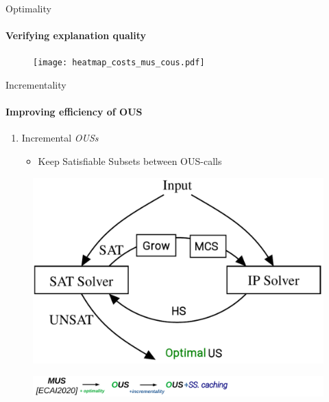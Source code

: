\documentclass[handout]{beamer}
\begin{document}
\begin{frame}{Optimality}
	\framesubtitle{Verifying explanation quality}
	\pause
			\begin{figure}
		\texttt{[image: heatmap\_costs\_mus\_cous.pdf]}
	\end{figure}
\end{frame}
	
	
	
	
		\begin{frame}{Incrementality}
			\framesubtitle{Improving efficiency of OUS}
		
		\begin{minipage}{0.59\textwidth}
			\begin{enumerate}
				\item {\color{vuborange} Incremental \emph{OUSs} }
				\begin{itemize}
					\item Keep Satisfiable Subsets between OUS-calls
				\end{itemize}	
			\end{enumerate}
		\end{minipage}
		\begin{minipage}{0.4\textwidth}
			\begin{figure}
				\includegraphics[width=\textwidth]{ihs.png}
			\end{figure}
		\end{minipage}
		\vfill
		\begin{figure}
			\includegraphics[width=\textwidth]{mus_to_ous_i.png}
		\end{figure}
	\end{frame}
	
\end{document}
